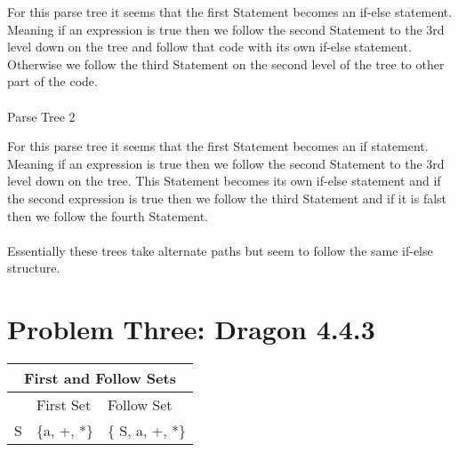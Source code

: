 \documentclass[letterpaper, 10pt,DIV=13]{scrartcl}
\numberwithin{equation}{section} %
\numberwithin{figure}{section} %
\numberwithin{table}{section} %
\begin{document}
For this parse tree it seems that the first Statement becomes an if-else statement. Meaning if an expression is true then we follow the second Statement to the 3rd level down on the tree and follow that code with its own if-else statement. Otherwise we follow the third Statement on the second level of the tree to other part of the code.

\paragraph{} Parse Tree 2


For this parse tree it seems that the first Statement becomes an if statement. Meaning if an expression is true then we follow the second Statement to the 3rd level down on the tree. This Statement becomes its own if-else statement and if the second expression is true then we follow the third Statement and if it is falst then we follow the fourth Statement. 
\\
\\
Essentially these trees take alternate paths but seem to follow the same if-else structure.

\newpage
\section{Problem Three: Dragon 4.4.3}

\begin{tabular}{ |p{3cm}||p{3cm}|p{3cm}|  }
 \hline
 \multicolumn{3}{|c|}{First and Follow Sets} \\
 \hline
 & First Set & Follow Set \\
 \hline
 S  &  \{a, +, *\}   & \{ S, a, +, *\} \\
 
 \hline
\end{tabular}



 

\pagebreak
\end{document}
